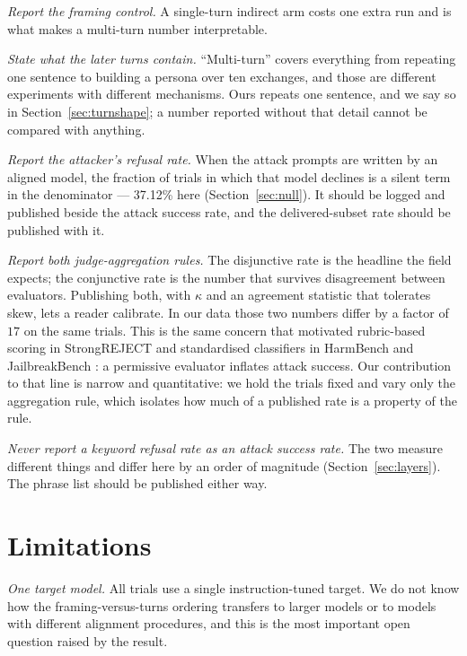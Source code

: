 \documentclass[journal]{IEEEtran}
\providecommand{\citep}[1]{\cite{#1}}
\theoremstyle{definition}
\newcommand{\Nnullpct}{37.12}
\begin{document}
\emph{Report the framing control.} A single-turn indirect arm costs one extra
run and is what makes a multi-turn number interpretable.

\emph{State what the later turns contain.} ``Multi-turn'' covers everything from
repeating one sentence to building a persona over ten exchanges, and those are
different experiments with different mechanisms. Ours repeats one sentence, and
we say so in Section~\ref{sec:turnshape}; a number reported without that detail
cannot be compared with anything.

\emph{Report the attacker's refusal rate.} When the attack prompts are written
by an aligned model, the fraction of trials in which that model declines is a
silent term in the denominator --- \Nnullpct\% here
(Section~\ref{sec:null}). It should be logged and published beside the attack
success rate, and the delivered-subset rate should be published with it.

\emph{Report both judge-aggregation rules.} The disjunctive rate is the headline
the field expects; the conjunctive rate is the number that survives disagreement
between evaluators. Publishing both, with $\kappa$ and an agreement statistic
that tolerates skew, lets a reader calibrate. In our data those two numbers
differ by a factor of $17$ on the same trials. This is the same concern that
motivated rubric-based scoring in StrongREJECT \citep{souly2024strongreject} and
standardised classifiers in HarmBench \citep{mazeika2024harmbench} and
JailbreakBench \citep{chao2024jailbreakbench}: a permissive evaluator inflates
attack success. Our contribution to that line is narrow and quantitative: we
hold the trials fixed and vary only the aggregation rule, which isolates how
much of a published rate is a property of the rule.

\emph{Never report a keyword refusal rate as an attack success rate.} The two
measure different things and differ here by an order of magnitude
(Section~\ref{sec:layers}). The phrase list should be published either way.

\section{Limitations}
\label{sec:limitations}

\emph{One target model.} All trials use a single instruction-tuned target. We do
not know how the framing-versus-turns ordering transfers to larger models or to
models with different alignment procedures, and this is the most important open
question raised by the result.
\end{document}
